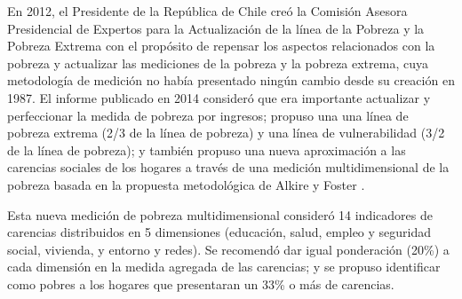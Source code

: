 \documentclass[12pt,letterpaper,spanish]{article}
\begin{document}
En 2012, el Presidente de la República de Chile creó la Comisión Asesora Presidencial de Expertos para la Actualización de la línea de la Pobreza y la Pobreza Extrema con el propósito de repensar los aspectos relacionados con la pobreza y actualizar las mediciones de la pobreza y la pobreza extrema, cuya metodología de medición no había presentado ningún cambio desde su creación en 1987. El informe publicado en 2014 consideró que era importante actualizar y perfeccionar la medida de pobreza por ingresos; propuso una una línea de pobreza extrema (2/3 de la línea de pobreza) y una línea de vulnerabilidad (3/2 de la línea de pobreza); y también propuso una nueva aproximación a las carencias sociales de los hogares a través de una medición multidimensional de la pobreza basada en la propuesta metodológica de Alkire y Foster \cite{JordanFuchs2014InformePobreza}. 

Esta nueva medición de pobreza multidimensional consideró 14 indicadores de carencias distribuidos en 5 dimensiones (educación, salud, empleo y seguridad social, vivienda, y entorno y redes). Se recomendó dar igual ponderación (20\%) a cada dimensión en la medida agregada de las carencias; y se propuso identificar como pobres a los hogares que presentaran un 33\% o más de carencias.
\end{document}
